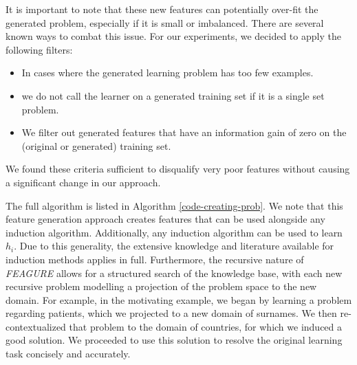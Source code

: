 \documentclass[twoside,11pt]{article}
\theoremstyle{definition}
\begin{document}
It is important to note that these new features can potentially over-fit the generated problem, especially if it is small or imbalanced. There are several known ways to combat this issue. For our experiments, we decided to apply the following filters:
\begin{itemize}
	\item In cases where the generated learning problem has too few examples.
	\item we do not call the learner on a generated training set if it is a single set problem.
	\item We filter out generated features that have an information gain of zero on the (original or generated) training set.
\end{itemize}  

We found these criteria sufficient to disqualify very poor features without causing a significant change in our approach.


The full algorithm is listed in Algorithm \ref{code-creating-prob}.
We note that this feature generation approach creates features that can be used alongside any induction algorithm. Additionally, any induction algorithm can be used to learn $h_i$. Due to this generality, the extensive knowledge and literature available for induction methods applies in full. Furthermore, the recursive nature of \emph{FEAGURE} allows for a structured search of the knowledge base, with each new recursive problem modelling a projection of the problem space to the new domain. For example, in the motivating example, we began by learning a problem regarding patients, which we projected to a new domain of surnames. We then re-contextualized that problem to the domain of countries, for which we induced a good solution. We proceeded to use this solution to resolve the original learning task concisely and accurately.
\end{document}
